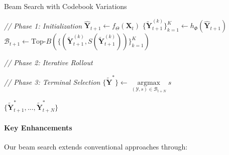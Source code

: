 \begin{algorithm}[h]
\SetAlgoLined
\DontPrintSemicolon
\caption{Beam Search with Codebook Variations}\label{alg:beam_search}
  
\emph{// Phase 1: Initialization}\;
$\hat{\mathbf{Y}}_{t+1} \leftarrow f_\Theta(\mathbf{X}_t)$\;
$\{\tilde{\mathbf{Y}}_{t+1}^{(k)}\}_{k=1}^K \leftarrow h_\Phi(\hat{\mathbf{Y}}_{t+1})$\;
$\mathcal{B}_{t+1} \leftarrow \text{Top-}B\left( \{ (\tilde{\mathbf{Y}}_{t+1}^{(k)}, S(\tilde{\mathbf{Y}}_{t+1}^{(k)})) \}_{k=1}^K \right)$\;

\emph{// Phase 2: Iterative Rollout}\;

\emph{// Phase 3: Terminal Selection}\;
$\{\tilde{\mathbf{Y}}^*\} \leftarrow \mathop{\arg\max}\limits_{(\mathcal{Y},s)\in\mathcal{B}_{t+N}} s$\;

\Return $\{\tilde{\mathbf{Y}}_{t+1}^*,...,\tilde{\mathbf{Y}}_{t+N}^*\}$\;
\end{algorithm}

\paragraph{Key Enhancements}  
Our beam search extends conventional approaches through:

